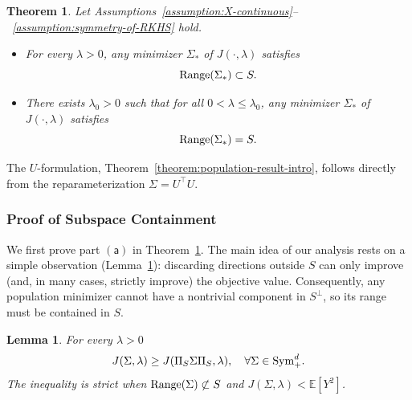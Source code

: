 \documentclass[sn-mathphys-num]{sn-jnl}%
\numberwithin{equation}{section}
\newcommand{\E}{\mathbb{E}}
\newtheorem{lemma}{Lemma}
\newcommand{\Range}{{\rm Range}}
\newcommand{\Sym}{{\rm \mathrm{Sym}}}
\theoremstyle{thmstyleone}%
\newtheorem{theorem}{Theorem}%
\theoremstyle{thmstyletwo}%
\theoremstyle{thmstylethree}%
\begin{document}
\vspace{.5em} 
\begin{theorem}
\label{thm:population-recovery}
Let Assumptions~\ref{assumption:X-continuous}--~\ref{assumption:symmetry-of-RKHS} 
hold. \vspace{.5em}
\begin{itemize}
\item[$\mathsf{(a)}$] 
For every $\lambda > 0$, any minimizer $\Sigma_*$ of $J(\cdot, \lambda)$ satisfies
\begin{equation*}
	\Range(\Sigma_*) \subset S.
\end{equation*}
\item[$\mathsf{(b)}$] 
There exists $\lambda_0 > 0$ such that for all $0 < \lambda \le \lambda_0$,
any minimizer $\Sigma_*$ of $J(\cdot, \lambda)$ satisfies 
\begin{equation*}
	\Range(\Sigma_*) = S.
\end{equation*} 
\end{itemize}
\end{theorem} 
The $U$-formulation, Theorem~\ref{theorem:population-result-intro}, follows directly from the reparameterization $\Sigma = U^\top U$.


\subsubsection{Proof of Subspace Containment} 

\indent \indent
We first prove part $\mathsf{(a)}$ in Theorem~\ref{thm:population-recovery}. 
The main idea of our analysis rests on a simple observation 
(Lemma~\ref{lemma:projection-reduce-function-value}): discarding directions 
outside $S$ can only improve (and, in many cases, strictly improve) the objective value. 
Consequently, any population minimizer cannot have a nontrivial component in $S^\perp$, 
so its range must be contained in $S$.

\vspace{0.5em}
\begin{lemma}
\label{lemma:projection-reduce-function-value}
For every $\lambda > 0$
\begin{equation*}
	J(\Sigma, \lambda) \ge J(\Pi_S \Sigma \Pi_S, \lambda),~~~\forall \Sigma \in \Sym_+^d.
\end{equation*} 
The inequality is strict when $\Range(\Sigma) \not \subset S$ and $J(\Sigma, \lambda) < \E[Y^2]$.
\end{lemma} 
\end{document}

